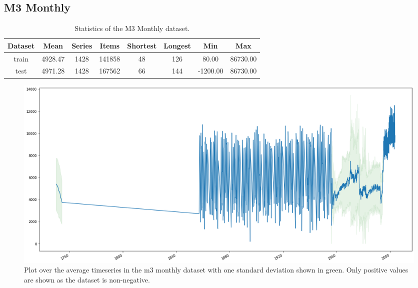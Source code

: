 \clearpage
\subsection{M3 Monthly}

\begin{table}[htb]
  \begin{tabular}{||c | c c c c c c c ||}
    \hline
    Dataset & Mean    & Series & Items  & Shortest & Longest & Min      & Max      \\ [0.5ex]
    \hline\hline
    train   & 4928.47 & 1428   & 141858 & 48       & 126     & 80.00    & 86730.00 \\
    \hline
    test    & 4971.28 & 1428   & 167562 & 66       & 144     & -1200.00 & 86730.00 \\
    \hline
  \end{tabular}
  \caption{Statistics of the M3 Monthly dataset.}
\end{table}

\begin{figure}[htb]
  \centering
  \includegraphics[width=\linewidth]{./img/m3_monthly_plot.png}
  \caption{Plot over the average timeseries in the m3 monthly dataset with one standard deviation shown in green. Only positive values are shown as the dataset is non-negative.}
  \label{fig:m3_monthly_plot}
  \endminipage\hfill
\end{figure}

